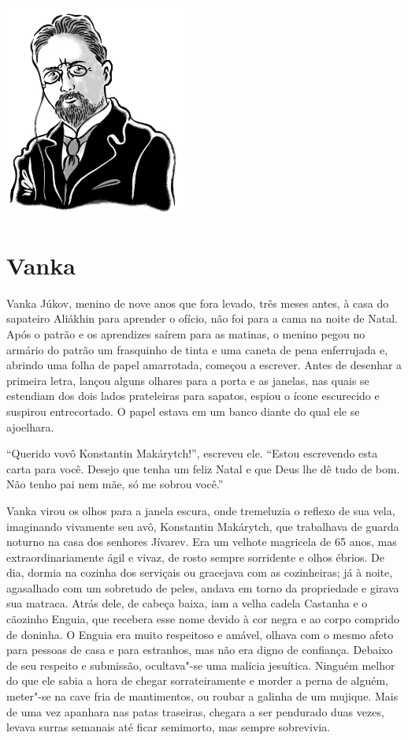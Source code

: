 \pagebreak
\thispagestyle{empty}
\mbox{}
\vfill
\begin{center}
\includegraphics[width=6cm]{./imgs/autor6.jpg}
\end{center}

\chapter{Vanka} \label{part6}

Vanka Júkov, menino de nove anos que fora levado, três meses antes, à
casa do sapateiro Aliákhin para aprender o ofício, não foi para a cama
na noite de Natal. Após o patrão e os aprendizes saírem para as matinas,
o menino pegou no armário do patrão um frasquinho de tinta e uma caneta
de pena enferrujada e, abrindo uma folha de papel amarrotada, começou a
escrever. Antes de desenhar a primeira letra, lançou alguns olhares para
a porta e as janelas, nas quais se estendiam dos dois lados prateleiras para sapatos, espiou o ícone escurecido e suspirou
entrecortado. O papel estava em um banco diante do qual ele se
ajoelhara.

``Querido vovô Konstantin Makárytch!'', escreveu ele. ``Estou escrevendo esta carta para você. Desejo que tenha um feliz Natal e que Deus lhe dê
tudo de bom. Não tenho pai nem mãe, só me sobrou você.''

Vanka virou os olhos para a janela escura, onde tremeluzia o reflexo de
sua vela, imaginando vivamente seu avô, Konstantin Makárytch, que
trabalhava de guarda noturno na casa dos senhores Jívarev. Era um
velhote magricela de 65 anos, mas extraordinariamente ágil e vivaz, de
rosto sempre sorridente e olhos ébrios. De dia, dormia na cozinha dos
serviçais ou gracejava com as cozinheiras; já à noite, agasalhado com um
sobretudo de peles, andava em torno da propriedade e girava sua matraca.
Atrás dele, de cabeça baixa, iam a velha cadela Castanha e o cãozinho
Enguia, que recebera esse nome devido à cor negra e ao corpo comprido de
doninha. O Enguia era muito respeitoso e amável, olhava com o mesmo
afeto para pessoas de casa e para estranhos, mas não era digno de
confiança. Debaixo de seu respeito e submissão, ocultava"-se uma malícia
jesuítica. Ninguém melhor do que ele sabia a hora de chegar
sorrateiramente e morder a perna de alguém, meter"-se na cave fria de
mantimentos, ou roubar a galinha de um mujique. Mais de uma vez apanhara
nas patas traseiras, chegara a ser pendurado duas vezes, levava surras
semanais até ficar semimorto, mas sempre sobrevivia.

